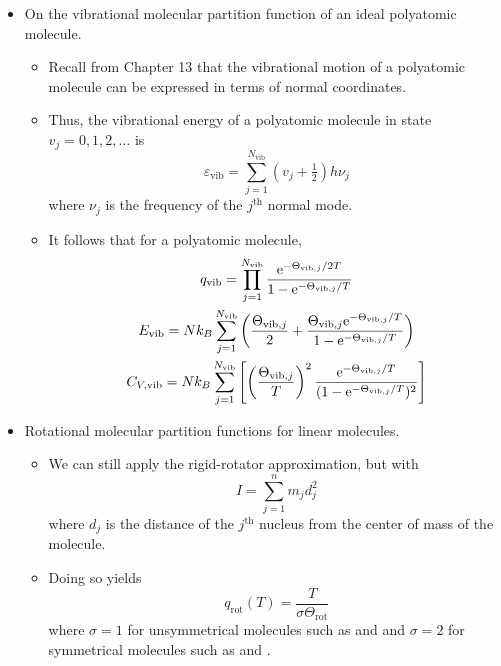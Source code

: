 \documentclass[../notes.tex]{subfiles}
\begin{document}
\begin{itemize}
    \item On the vibrational molecular partition function of an ideal polyatomic molecule.
    \begin{itemize}
        \item Recall from Chapter 13 that the vibrational motion of a polyatomic molecule can be expressed in terms of normal coordinates.
        \item Thus, the vibrational energy of a polyatomic molecule in state $v_j=0,1,2,\dots$ is
        \begin{equation*}
            \varepsilon_\text{vib} = \sum_{j=1}^{N_\text{vib}}\left( v_j+\tfrac{1}{2} \right)h\nu_j
        \end{equation*}
        where $\nu_j$ is the frequency of the $j^\text{th}$ normal mode.
        \item It follows that for a polyatomic molecule,
        \begin{gather*}
            q_\text{vib} = \prod_{j=1}^{N_\text{vib}}\frac{\e[-\Theta_{\text{vib},j}/2T]}{1-\e[-\Theta_{\text{vib},j}/T]}\\
            E_\text{vib} = Nk_B\sum_{j=1}^{N_\text{vib}}\left( \frac{\Theta_{\text{vib},j}}{2}+\frac{\Theta_{\text{vib},j}\e[-\Theta_{\text{vib},j}/T]}{1-\e[-\Theta_{\text{vib},j}/T]} \right)\\
            C_{V,\text{vib}} = Nk_B\sum_{j=1}^{N_\text{vib}}\left[ \left( \frac{\Theta_{\text{vib},j}}{T} \right)^2\frac{\e[-\Theta_{\text{vib},j}/T]}{(1-\e[-\Theta_{\text{vib},j}/T])^2} \right]
        \end{gather*}
    \end{itemize}
    \item Rotational molecular partition functions for linear molecules.
    \begin{itemize}
        \item We can still apply the rigid-rotator approximation, but with
        \begin{equation*}
            I = \sum_{j=1}^nm_jd_j^2
        \end{equation*}
        where $d_j$ is the distance of the $j^\text{th}$ nucleus from the center of mass of the molecule.
        \item Doing so yields
        \begin{equation*}
            q_\text{rot}(T) = \frac{T}{\sigma\Theta_\text{rot}}
        \end{equation*}
        where $\sigma=1$ for unsymmetrical molecules such as  and  and $\sigma=2$ for symmetrical molecules such as  and .

\end{itemize}
\end{itemize}
\end{document}
